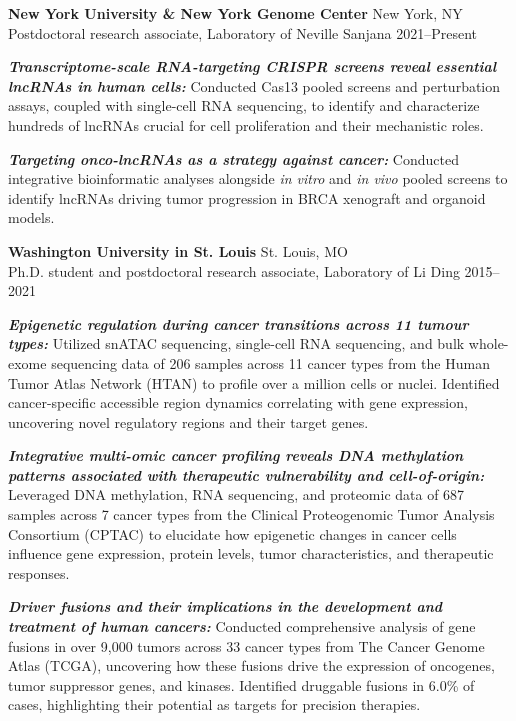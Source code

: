 \documentclass[letterpaper,11pt]{cv}
\begin{document}
\begin{entrylist}
\raggedleft
\item \textbf{New York University \& New York Genome Center} \hfill New York, NY\\
Postdoctoral research associate, {Laboratory of Neville Sanjana } \hfill
2021--Present
\begin{detaillist}
    \item \textit{\textbf{Transcriptome-scale RNA-targeting CRISPR screens reveal essential lncRNAs in human cells:}} Conducted Cas13 pooled screens and perturbation assays, coupled with single-cell RNA sequencing, to identify and characterize hundreds of lncRNAs crucial for cell proliferation and their mechanistic roles.
    \item \textit{\textbf{Targeting onco-lncRNAs as a strategy against cancer:}} Conducted integrative bioinformatic analyses alongside \textit{in vitro} and \textit{in vivo} pooled screens to identify lncRNAs driving tumor progression in BRCA xenograft and organoid models. 
\end{detaillist}

\item \textbf{Washington University in St. Louis} \hfill St. Louis, MO\\
Ph.D. student and postdoctoral research associate, {Laboratory of Li Ding } \hfill
2015--2021
\begin{detaillist}
    \item \textit{\textbf{Epigenetic regulation during cancer transitions across 11 tumour types:}} Utilized snATAC sequencing, single-cell RNA sequencing, and bulk whole-exome sequencing data of 206 samples across 11 cancer types from the Human Tumor Atlas Network (HTAN) to profile over a million cells or nuclei. Identified cancer-specific accessible region dynamics correlating with gene expression, uncovering novel regulatory regions and their target genes.
    \item \textit{\textbf{Integrative multi-omic cancer profiling reveals DNA methylation patterns associated with therapeutic vulnerability and cell-of-origin:}} Leveraged DNA methylation, RNA sequencing, and proteomic data of 687 samples across 7 cancer types from the Clinical Proteogenomic Tumor Analysis Consortium (CPTAC) to elucidate how epigenetic changes in cancer cells influence gene expression, protein levels, tumor characteristics, and therapeutic responses.
    \item \textit{\textbf{Driver fusions and their implications in the development and treatment of human cancers:}} Conducted comprehensive analysis of gene fusions in over 9,000 tumors across 33 cancer types from The Cancer Genome Atlas (TCGA), uncovering how these fusions drive the expression of oncogenes, tumor suppressor genes, and kinases. Identified druggable fusions in 6.0\% of cases, highlighting their potential as targets for precision therapies.
\end{detaillist}


\end{entrylist}
\end{document}
